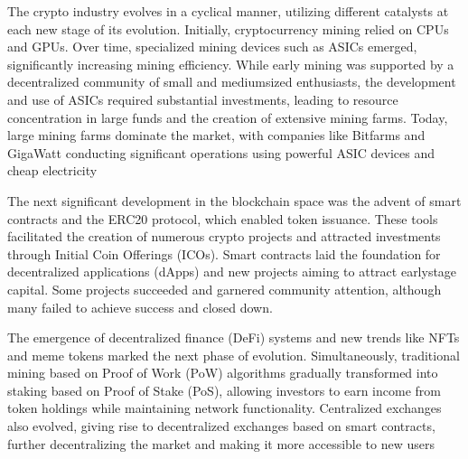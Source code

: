 \documentclass[a4paper,12pt,english]{sphinxmanual}
\begin{document}
\sphinxAtStartPar
The crypto industry evolves in a cyclical manner, utilizing different
catalysts at each new stage of its evolution. Initially, cryptocurrency
mining relied on CPUs and GPUs. Over time, specialized mining devices
such as ASICs emerged, significantly increasing mining efficiency. While
early mining was supported by a decentralized community of small and
medium\sphinxhyphen{}sized enthusiasts, the development and use of ASICs required
substantial investments, leading to resource concentration in large
funds and the creation of extensive mining farms. Today, large mining
farms dominate the market, with companies like Bitfarms and GigaWatt
conducting significant operations using powerful ASIC devices and cheap
electricity %
\begin{footnote}[3]\sphinxAtStartFootnote
{}
%
\end{footnote}

\sphinxAtStartPar
The next significant development in the blockchain space was the advent
of smart contracts and the ERC\sphinxhyphen{}20 protocol, which enabled token
issuance. These tools facilitated the creation of numerous crypto
projects and attracted investments through Initial Coin Offerings
(ICOs). Smart contracts laid the foundation for decentralized
applications (dApps) and new projects aiming to attract early\sphinxhyphen{}stage
capital. Some projects succeeded and garnered community attention,
although many failed to achieve success and closed down.

\sphinxAtStartPar
The emergence of decentralized finance (DeFi) systems and new trends
like NFTs and meme tokens marked the next phase of evolution.
Simultaneously, traditional mining based on Proof of Work (PoW)
algorithms gradually transformed into staking based on Proof of Stake
(PoS), allowing investors to earn income from token holdings while
maintaining network functionality. Centralized exchanges also evolved,
giving rise to decentralized exchanges based on smart contracts, further
decentralizing the market and making it more accessible to new users %
\begin{footnote}[4]\sphinxAtStartFootnote
{}
%
\end{footnote}
\end{document}

